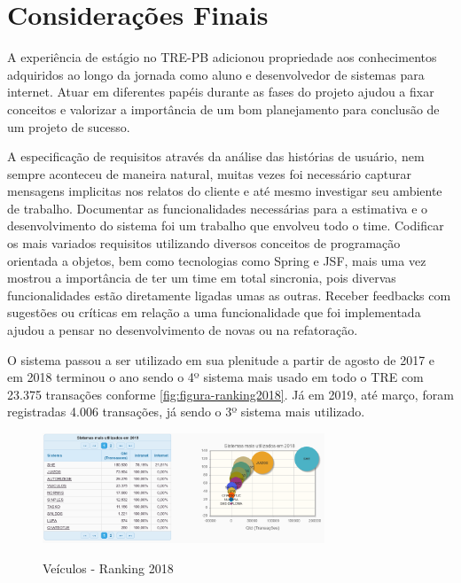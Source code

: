 
\chapter{Considerações Finais}
\label{chap:consideracoesFinais}

A experiência de estágio no TRE-PB adicionou propriedade aos conhecimentos adquiridos ao longo da jornada como aluno e desenvolvedor de sistemas para internet. Atuar em diferentes papéis durante as fases do projeto ajudou a fixar conceitos e valorizar a importância de um bom planejamento para conclusão de um projeto de sucesso. 

A especificação de requisitos através da análise das histórias de usuário, nem sempre aconteceu de maneira natural, muitas vezes foi necessário capturar mensagens implicitas nos relatos do cliente e até mesmo investigar seu ambiente de trabalho. Documentar as funcionalidades necessárias para a estimativa e o desenvolvimento do sistema foi um trabalho que envolveu todo o time.
Codificar os mais variados requisitos utilizando diversos conceitos de programação orientada a objetos, bem como tecnologias como Spring e JSF, mais uma vez mostrou a importância de ter um time em total sincronia, pois divervas funcionalidades estão diretamente ligadas umas as outras. Receber feedbacks com sugestões ou críticas em relação a uma funcionalidade que foi implementada ajudou a pensar no desenvolvimento de novas ou na refatoração.

O sistema passou a ser utilizado em sua plenitude a partir de agosto de 2017 e em 2018 terminou o ano sendo o 4º sistema mais usado em todo o TRE com 23.375 transações conforme \autoref{fig:figura-ranking2018}. Já em 2019, até março, foram registradas 4.006 transações, já sendo o 3º sistema mais utilizado.

\begin{figure}[!htb]
    \centering
    \caption{Veículos - Ranking 2018}
    \includegraphics[width=0.75\textwidth]{./dados/figuras/ranking2018.png}
    \label{fig:figura-ranking2018}
\end{figure}

